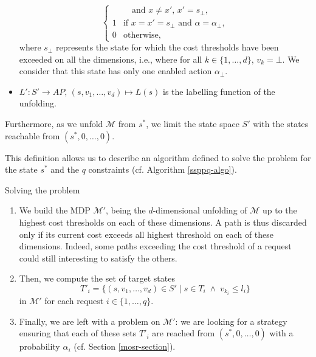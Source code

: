 \begin{definition}
\begin{itemize}
\[\begin{cases}
      & \quad \text{and } x \neq x', \, x' = s_\bot,\\
      1 & \text{if } x=x'=s_\bot \text{ and } \alpha = \alpha_\bot, \\
      0 & \text{otherwise,}
    \end{cases}
    \]
    where $s_\bot$ represents the state for which the cost thresholds have been exceeded on all the dimensions, i.e., where for all $k \in \{1, \dots, d\}$, $v_k = \bot$. We consider that this state has only one enabled action $\alpha_\bot$.
    \item $L': S' \rightarrow AP,\, (s, v_1, \dots, v_d) \mapsto L(s)$ is the labelling function of the unfolding.
  \end{itemize}
    Furthermore, as we unfold $\mathcal{M}$ from $s^*$, we limit the state space $S'$ with the states reachable from $(s^*, 0, \dots, 0)$.
\end{definition}

This definition allows us to describe an algorithm defined to solve the \SSPPQ{} problem for the state $s^*$ and the $q$ constraints (cf. Algorithm \ref{ssppq-algo}).

\begin{algorithm}
\caption{Solving the \SSPPQ{} problem}\label{ssppq-algo}
\begin{enumerate}
\item We build the MDP $\mathcal{M}'$, being the $d$-dimensional unfolding of $\mathcal{M}$ up to the highest cost thresholds on each of these dimensions.
  A path is thus discarded only if its current cost exceeds all highest threshold on each of these dimensions.
  Indeed, some paths exceeding the cost threshold of a request could still interesting to satisfy the others.
  \item Then, we compute the set of target states \[T'_i = \{ (s, v_1, \dots, v_d) \in S' \; | \; s \in T_i  \; \wedge \; v_{k_i} \leq l_i \}\] in $\mathcal{M}'$ for each request $i \in \{1, \dots, q\}$.
  \item Finally, we are left with a \MOSR{} problem on $\mathcal{M}'$: we are looking for a strategy ensuring that each of these sets $T'_i$ are reached from $(s^*, 0, \dots, 0)$ with a probability $\alpha_i$ (cf. Section \ref{mosr-section}).
\end{enumerate}
\end{algorithm}

